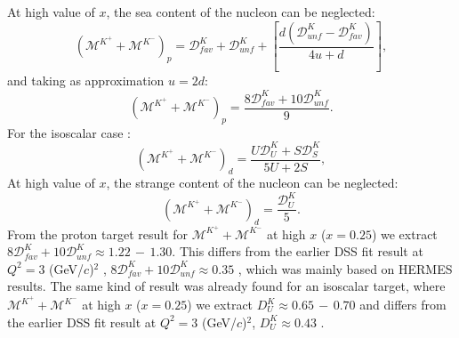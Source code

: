 At high value of $x$, the sea content of the nucleon can be neglected:
%
\begin{equation}
  \left( \mathscr{M}^{K^+}+\mathscr{M}^{K^-} \right)_p = \mathscr{D}^K_{fav}+\mathscr{D}^K_{unf}+\left[\frac{d\left( \mathscr{D}^K_{unf}-\mathscr{D}^K_{fav} \right)}{4u + d} \right],
\end{equation}
%
and taking as approximation $u=2d$:
%
\begin{equation}
  \left( \mathscr{M}^{K^+}+\mathscr{M}^{K^-} \right)_p = \frac{8\mathscr{D}^K_{fav}+10\mathscr{D}^K_{unf}}{9}.
\end{equation}
%
For the isoscalar case \cite{MarcinNic}:
%
\begin{equation}\label{eq:ksum}
  \left( \mathscr{M}^{K^+}+\mathscr{M}^{K^-} \right)_d = \frac{U\mathscr{D}^K_U+S\mathscr{D}^K_S}{5U+2S},
\end{equation}
%
At high value of $x$, the strange content of the nucleon can be neglected:
%
\begin{equation}\label{eq:ksum}
  \left( \mathscr{M}^{K^+}+\mathscr{M}^{K^-} \right)_d = \frac{\mathscr{D}^K_U}{5}.
\end{equation}
%
From the proton target result for $\mathscr{M}^{K^+}+\mathscr{M}^{K^-}$ at high $x$ ($x = 0.25$) we extract $8\mathscr{D}^K_{fav}+10\mathscr{D}^K_{unf} \approx 1.22\,-\,1.30$. This differs from the earlier DSS fit result at $Q^2 = 3$ (GeV/$c$)$^2$ , $8\mathscr{D}^K_{fav}+10\mathscr{D}^K_{unf} \approx 0.35$ \cite{DSS07}, which was mainly based on HERMES results. The same kind of result was already found for an isoscalar target, where $\mathscr{M}^{K^+}+\mathscr{M}^{K^-}$ at high $x$ ($x = 0.25$) we extract $D_U^K \approx 0.65\,-\,0.70$ and differs from the earlier DSS fit result at $Q^2 = 3$ (GeV/$c$)$^2$, $D_U^K \approx 0.43$ \cite{DSS07}.

